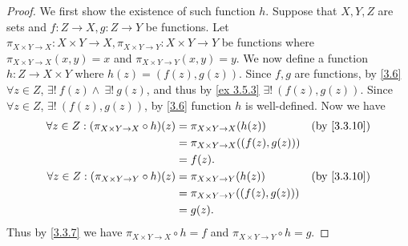 \begin{proof}
  We first show the existence of such function \(h\).
  Suppose that \(X, Y, Z\) are sets and \(f : Z \to X, g : Z \to Y\) be functions.
  Let \(\pi_{X \times Y \to X} : X \times Y \to X, \pi_{X \times Y \to Y} : X \times Y \to Y\) be functions where \(\pi_{X \times Y \to X}(x, y) = x\) and \(\pi_{X \times Y \to Y}(x, y) = y\).
  We now define a function \(h : Z \to X \times Y\) where \(h(z) = (f(z), g(z))\).
  Since \(f, g\) are functions, by \cref{3.6} \(\forall z \in Z\), \(\exists!\ f(z) \land \ \exists!\ g(z)\), and thus by \cref{ex 3.5.3} \(\exists!\ (f(z), g(z))\).
  Since \(\forall z \in Z\), \(\exists!\ (f(z), g(z))\), by \cref{3.6} function \(h\) is well-defined.
  Now we have
  \begin{align*}
    \forall z \in Z : (\pi_{X \times Y \to X} \circ h)(z) & = \pi_{X \times Y \to X}(h(z))         & \text{(by \cref{3.3.10})} \\
                                                          & = \pi_{X \times Y \to X}((f(z), g(z)))                             \\
                                                          & = f(z).                                                            \\
    \forall z \in Z : (\pi_{X \times Y \to Y} \circ h)(z) & = \pi_{X \times Y \to Y}(h(z))         & \text{(by \cref{3.3.10})} \\
                                                          & = \pi_{X \times Y \to Y}((f(z), g(z)))                             \\
                                                          & = g(z).
  \end{align*}
  Thus by \cref{3.3.7} we have \(\pi_{X \times Y \to X} \circ h = f\) and \(\pi_{X \times Y \to Y} \circ h = g\).


\end{proof}
